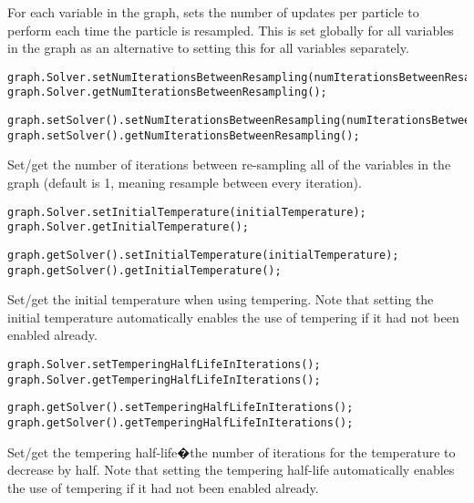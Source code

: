 For each variable in the graph, sets the number of updates per particle to perform each time the particle is resampled. This is set globally for all variables in the graph as an alternative to setting this for all variables separately.

\ifmatlab
\begin{lstlisting}
graph.Solver.setNumIterationsBetweenResampling(numIterationsBetweenResampling);
graph.Solver.getNumIterationsBetweenResampling();
\end{lstlisting}
\fi

\ifjava
\begin{lstlisting}
graph.setSolver().setNumIterationsBetweenResampling(numIterationsBetweenResampling);
graph.setSolver().getNumIterationsBetweenResampling();
\end{lstlisting}
\fi

Set/get the number of iterations between re-sampling all of the variables in the graph (default is 1, meaning resample between every iteration).

\ifmatlab
\begin{lstlisting}
graph.Solver.setInitialTemperature(initialTemperature);
graph.Solver.getInitialTemperature();
\end{lstlisting}
\fi

\ifjava
\begin{lstlisting}
graph.getSolver().setInitialTemperature(initialTemperature);
graph.getSolver().getInitialTemperature();
\end{lstlisting}
\fi


Set/get the initial temperature when using tempering. Note that setting the initial temperature automatically enables the use of tempering if it had not been enabled already.

\ifmatlab
\begin{lstlisting}
graph.Solver.setTemperingHalfLifeInIterations();
graph.Solver.getTemperingHalfLifeInIterations();
\end{lstlisting}
\fi

\ifjava
\begin{lstlisting}
graph.getSolver().setTemperingHalfLifeInIterations();
graph.getSolver().getTemperingHalfLifeInIterations();
\end{lstlisting}
\fi

Set/get the tempering half-life�the number of iterations for the temperature to decrease by half. Note that setting the tempering half-life automatically enables the use of tempering if it had not been enabled already.

